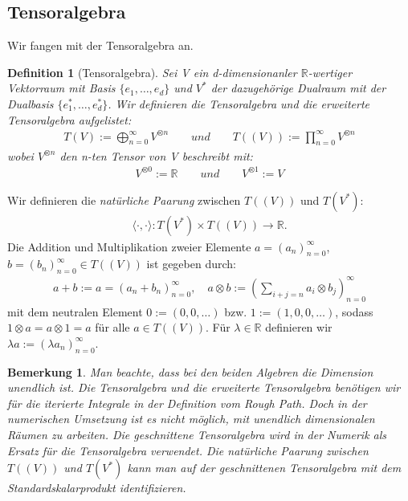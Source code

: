 \documentclass[12pt,titlepage,headsepline]{article}
\newtheorem{definition}{Definition}[section]
\newtheorem*{bemerkung*}{Bemerkung}
\begin{document}
      \subsection{Tensoralgebra}
      Wir fangen mit der Tensoralgebra an.
      \begin{definition}[Tensoralgebra]
        Sei V ein d-dimensionanler $\mathbb{R}$-wertiger Vektorraum mit Basis $\{e_1,\ldots,e_d\}$ und $V^*$ der dazugehörige Dualraum mit der Dualbasis $\{e^*_1,\ldots,e^*_d\}$. Wir definieren \textit{die Tensoralgebra} und \textit{die erweiterte Tensoralgebra} aufgelistet:
        \begin{align*}
          T(V):=\bigoplus^{\infty}_{n=0}V^{\otimes n}
          \qquad und \qquad
          T((V)):=\prod^{\infty}_{n=0}V^{\otimes n}
        \end{align*}
        wobei $V^{\otimes n}$ den n-ten Tensor von V beschreibt mit:
        \begin{align*}
          V^{\otimes 0} := \mathbb{R}
          \qquad und \qquad
          V^{\otimes 1} := V
        \end{align*}
      \end{definition}
      Wir definieren die \textit{natürliche Paarung} zwischen $T((V))$ und $T(V^*)$:
      \begin{align*}
        \langle \cdot,\cdot \rangle : T(V^*) \times T((V)) \rightarrow \mathbb{R}.
      \end{align*}
      Die Addition und Multiplikation zweier Elemente $a=(a_n)^{\infty}_{n=0}$, $b=(b_n)^{\infty}_{n=0} \in T((V))$ ist gegeben durch:
      \begin{align*}
        a + b := a=(a_n+b_n)^{\infty}_{n=0}, \quad
        a \otimes b := (\sum_{i+j=n}a_i \otimes b_j)^{\infty}_{n=0}
      \end{align*}
      mit dem neutralen Element $0:=(0,0,\ldots)$ bzw. $1:=(1,0,0,\ldots)$, sodass $1 \otimes a = a \otimes 1 = a$ für alle $a \in T((V))$.
      Für $\lambda \in \mathbb{R}$ definieren wir $\lambda a :=(\lambda a_n)^{\infty}_{n=0}$.

      \begin{bemerkung*}
        \textup{
        Man beachte, dass bei den beiden Algebren die Dimension unendlich ist. Die Tensoralgebra und die erweiterte Tensoralgebra benötigen wir für die iterierte Integrale in der Definition vom Rough Path. Doch in der numerischen Umsetzung ist es nicht möglich, mit unendlich dimensionalen Räumen zu arbeiten. Die geschnittene Tensoralgebra wird in der Numerik als Ersatz für die Tensoralgebra verwendet. Die natürliche Paarung zwischen $T((V))$ und $T(V^*)$ kann man auf der geschnittenen Tensoralgebra mit dem Standardskalarprodukt identifizieren.
        }
      \end{bemerkung*}
\end{document}

